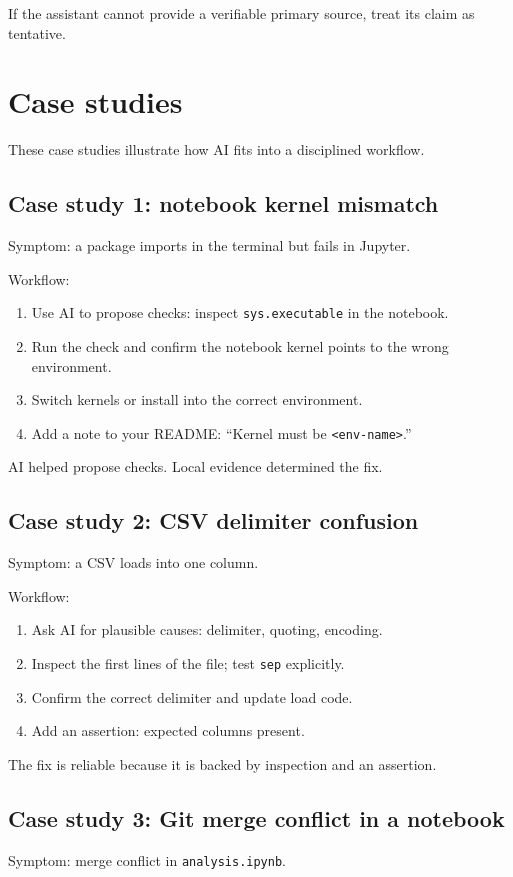 If the assistant cannot provide a verifiable primary source, treat its claim as tentative.

\section{Case studies}
These case studies illustrate how AI fits into a disciplined workflow.

\subsection{Case study 1: notebook kernel mismatch}
Symptom: a package imports in the terminal but fails in Jupyter.

Workflow:
\begin{enumerate}[noitemsep]
  \item Use AI to propose checks: inspect \texttt{sys.executable} in the notebook.
  \item Run the check and confirm the notebook kernel points to the wrong environment.
  \item Switch kernels or install into the correct environment.
  \item Add a note to your README: ``Kernel must be \texttt{<env-name>}.''
\end{enumerate}

AI helped propose checks. Local evidence determined the fix.

\subsection{Case study 2: CSV delimiter confusion}
Symptom: a CSV loads into one column.

Workflow:
\begin{enumerate}[noitemsep]
  \item Ask AI for plausible causes: delimiter, quoting, encoding.
  \item Inspect the first lines of the file; test \texttt{sep} explicitly.
  \item Confirm the correct delimiter and update load code.
  \item Add an assertion: expected columns present.
\end{enumerate}

The fix is reliable because it is backed by inspection and an assertion.

\subsection{Case study 3: Git merge conflict in a notebook}
Symptom: merge conflict in \texttt{analysis.ipynb}.

